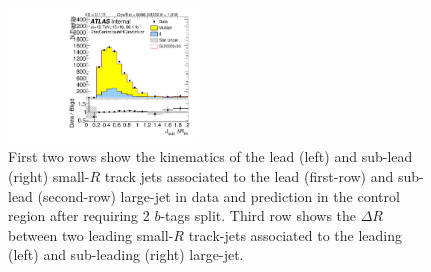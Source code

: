 \begin{figure}[htbp!]
\begin{center}
\includegraphics[width=0.45\textwidth,angle=-90]{figures/boosted/Control/b77_TwoTag_split_Control_sublHCand_trk_dr.pdf}
  \caption{First two rows show the kinematics of the lead (left) and sub-lead (right) small-$R$ track jets associated to the lead (first-row) and sub-lead (second-row) large-\R jet in data and prediction in the control region after requiring 2 $b$-tags split. Third row shows the $\Delta R$ between two leading small-$R$ track-jets associated to the leading (left) and sub-leading (right) large-\R jet.  }
  \label{fig:boosted-2bs-control-ak2}
\end{center}
\end{figure}


